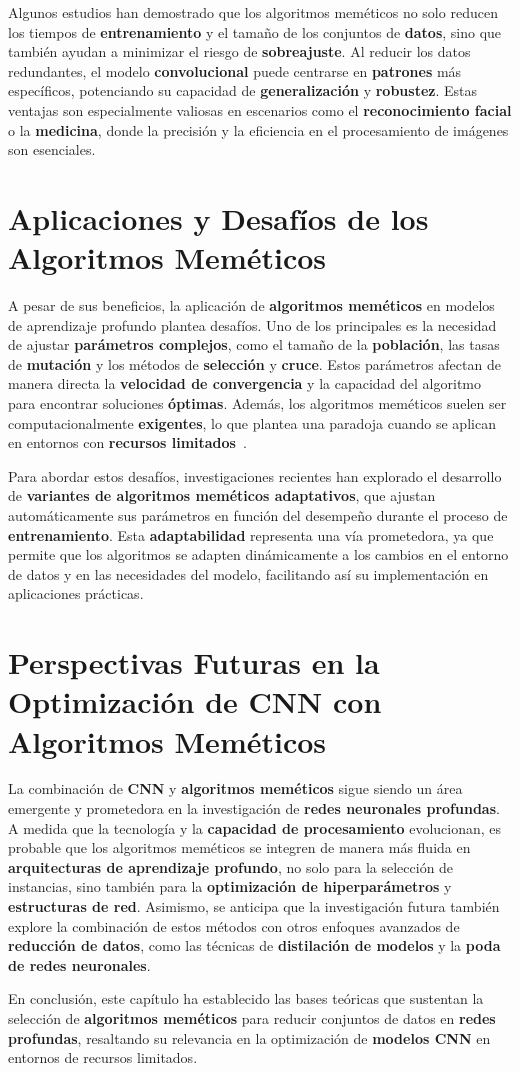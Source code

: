 Algunos estudios han demostrado que los algoritmos meméticos no solo reducen los tiempos de \textbf{entrenamiento} y el
tamaño de los conjuntos de \textbf{datos}, sino que también ayudan a minimizar el riesgo de \textbf{sobreajuste}.
Al reducir los datos redundantes, el modelo \textbf{convolucional} puede centrarse en \textbf{patrones} más
específicos, potenciando su capacidad de \textbf{generalización} y \textbf{robustez}.
Estas ventajas son especialmente valiosas en escenarios como el \textbf{reconocimiento facial} o la \textbf{medicina},
donde la precisión y la eficiencia en el procesamiento de imágenes son esenciales.


\section{Aplicaciones y Desafíos de los Algoritmos Meméticos}
\label{sec:aplicaciones-y-desafios-de-los-algoritmos-memeticos}
A pesar de sus beneficios, la aplicación de \textbf{algoritmos meméticos} en modelos de aprendizaje profundo plantea
desafíos.
Uno de los principales es la necesidad de ajustar \textbf{parámetros complejos}, como el tamaño de la
\textbf{población}, las tasas de \textbf{mutación} y los métodos de \textbf{selección} y \textbf{cruce}.
Estos parámetros afectan de manera directa la \textbf{velocidad de convergencia} y la capacidad del algoritmo para
encontrar soluciones \textbf{óptimas}.
Además, los algoritmos meméticos suelen ser computacionalmente \textbf{exigentes}, lo que plantea una paradoja cuando
se aplican en entornos con \textbf{recursos limitados}~\cite{goldberg_genetic_1989}.


Para abordar estos desafíos, investigaciones recientes han explorado el desarrollo de
\textbf{variantes de algoritmos meméticos adaptativos}, que ajustan automáticamente sus parámetros en función del
desempeño durante el proceso de \textbf{entrenamiento}.
Esta \textbf{adaptabilidad} representa una vía prometedora, ya que permite que los algoritmos se adapten dinámicamente
a los cambios en el entorno de datos y en las necesidades del modelo, facilitando así su implementación en aplicaciones
prácticas.


\section{Perspectivas Futuras en la Optimización de CNN con Algoritmos Meméticos}
\label{sec:perspectivas-futuras-en-la-optimizacion-de-cnn-con-algoritmos-memeticos}
La combinación de \textbf{CNN} y \textbf{algoritmos meméticos} sigue siendo un área emergente y prometedora en la
investigación de \textbf{redes neuronales profundas}.
A medida que la tecnología y la \textbf{capacidad de procesamiento} evolucionan, es probable que los algoritmos
meméticos se integren de manera más fluida en \textbf{arquitecturas de aprendizaje profundo}, no solo para la selección
de instancias, sino también para la \textbf{optimización de hiperparámetros} y \textbf{estructuras de red}.
Asimismo, se anticipa que la investigación futura también explore la combinación de estos métodos con otros enfoques
avanzados de \textbf{reducción de datos}, como las técnicas de \textbf{distilación de modelos} y la
\textbf{poda de redes neuronales}.


En conclusión, este capítulo ha establecido las bases teóricas que sustentan la selección de
\textbf{algoritmos meméticos} para reducir conjuntos de datos en \textbf{redes profundas}, resaltando su relevancia en
la optimización de \textbf{modelos CNN} en entornos de recursos limitados.
